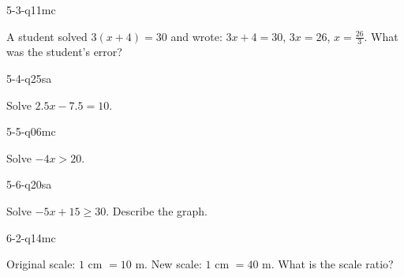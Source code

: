 \begin{practiceQuestion}{5-3-q11}{mc}
\begin{questionText}
A student solved $3(x + 4) = 30$ and wrote: $3x + 4 = 30$, $3x = 26$, $x = \frac{26}{3}$. What was the student's error?
\end{questionText}
\end{practiceQuestion}

\begin{practiceQuestion}{5-4-q25}{sa}
\begin{questionText}
Solve $2.5x - 7.5 = 10$.
\end{questionText}
\end{practiceQuestion}

\begin{practiceQuestion}{5-5-q06}{mc}
\begin{questionText}
Solve $-4x > 20$.
\end{questionText}
\end{practiceQuestion}

\begin{practiceQuestion}{5-6-q20}{sa}
\begin{questionText}
Solve $-5x + 15 \geq 30$. Describe the graph.
\end{questionText}
\end{practiceQuestion}

\begin{practiceQuestion}{6-2-q14}{mc}
\begin{questionText}
Original scale: $1$ cm $= 10$ m. New scale: $1$ cm $= 40$ m. What is the scale ratio?
\end{questionText}
\end{practiceQuestion}

